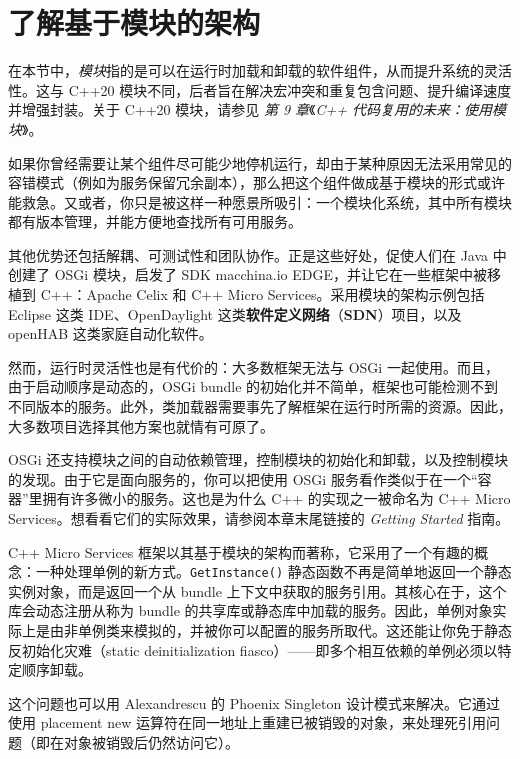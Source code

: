 \section{了解基于模块的架构}

\label{idx:126}
在本节中，\emph{模块}指的是可以在运行时加载和卸载的软件组件，从而提升系统的灵活性。这与 C++20 模块不同，后者旨在解决宏冲突和重复包含问题、提升编译速度并增强封装。关于 C++20 模块，请参见 \emph{第 9 章}《\emph{C++ 代码复用的未来：使用模块}》。

如果你曾经需要让某个组件尽可能少地停机运行，却由于某种原因无法采用常见的容错模式（例如为服务保留冗余副本），那么把这个组件做成基于模块的形式或许能救急。又或者，你只是被这样一种愿景所吸引：一个模块化系统，其中所有模块都有版本管理，并能方便地查找所有可用服务。

\label{idx:127}
其他优势还包括解耦、可测试性和团队协作。正是这些好处，促使人们在 Java 中创建了 OSGi 模块，启发了 SDK macchina.io EDGE，并让它在一些框架中被移植到 C++：Apache Celix 和 C++ Micro Services。采用模块的架构示例包括 Eclipse 这类 IDE、OpenDaylight 这类\textbf{软件定义网络}（\textbf{SDN}）项目，以及 openHAB 这类家庭自动化软件。


然而，运行时灵活性也是有代价的：大多数框架无法与 OSGi 一起使用。而且，由于启动顺序是动态的，OSGi bundle 的初始化并不简单，框架也可能检测不到不同版本的服务。此外，类加载器需要事先了解框架在运行时所需的资源。因此，大多数项目选择其他方案也就情有可原了。

\label{idx:128}
OSGi 还支持模块之间的自动依赖管理，控制模块的初始化和卸载，以及控制模块的发现。由于它是面向服务的，你可以把使用 OSGi 服务看作类似于在一个“容器”里拥有许多微小的服务。这也是为什么 C++ 的实现之一被命名为 C++ Micro Services。想看看它们的实际效果，请参阅本章末尾链接的 \emph{Getting Started} 指南。

\label{idx:129}
C++ Micro Services 框架以其基于模块的架构而著称，它采用了一个有趣的概念：一种处理单例的新方式。\texttt{Get\allowbreak{}Instance(\allowbreak{})\allowbreak{}} 静态函数不再是简单地返回一个静态实例对象，而是返回一个从 bundle 上下文中获取的服务引用。其核心在于，这个库会动态注册从称为 bundle 的共享库或静态库中加载的服务。因此，单例对象实际上是由非单例类来模拟的，并被你可以配置的服务所取代。这还能让你免于静态反初始化灾难（static deinitialization fiasco）——即多个相互依赖的单例必须以特定顺序卸载。

\label{idx:130}
这个问题也可以用 Alexandrescu 的 Phoenix Singleton 设计模式来解决。它通过使用 placement new 运算符在同一地址上重建已被销毁的对象，来处理死引用问题（即在对象被销毁后仍然访问它）。

